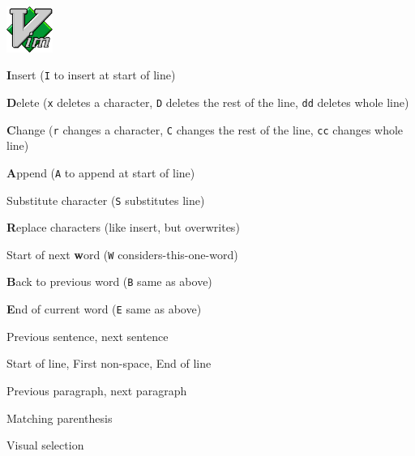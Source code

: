 \documentclass[12pt, a4paper]
{article}
\begin{document}
\pagestyle{empty}

\begin{center}
	 \hspace{1em}  \includegraphics[height=1.5cm]{Vim_logo}
	\vspace*{0.5em}
\end{center}

\begin{multicols}{3}
	
\begin{description}[nolistsep]
	\item[i] \textbf{I}nsert (\texttt{I} to insert at start of line)
	\item[d] \textbf{D}elete (\texttt{x} deletes a character, \texttt{D} deletes the rest of the line, \texttt{dd} deletes whole line)
	\item[c] \textbf{C}hange (\texttt{r} changes a character, \texttt{C} changes the rest of the line, \texttt{cc} changes whole line)
	\item[a] \textbf{A}ppend (\texttt{A} to append at start of line)
	\item[s] Substitute character (\texttt{S} substitutes line)
	\item[R] \textbf{R}eplace characters (like insert, but overwrites)
\end{description}


\begin{description}[nolistsep]
	\item[w] Start of next \textbf{w}ord (\texttt{W} considers-this-one-word)
	\item[b] \textbf{B}ack to previous word (\texttt{B} same as above)
	\item[e] \textbf{E}nd of current word (\texttt{E} same as above)
	\item[( )] Previous sentence, next sentence
	\item[0 \textasciicircum \ \$] Start of line, First non-space, End of line
	\item[\{ \}] Previous paragraph, next paragraph
	\item[\%] Matching parenthesis
	\item[v] Visual selection
\end{description}


\end{multicols}
\end{document}
